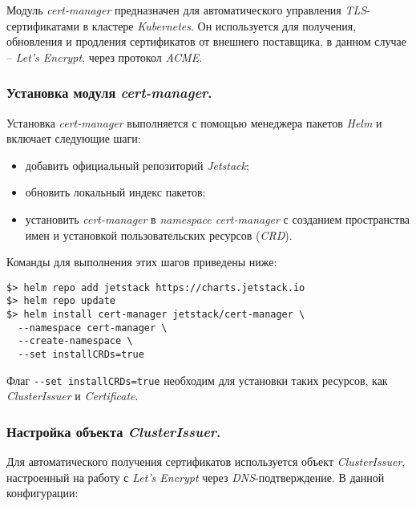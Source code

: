 Модуль \textit{cert-manager} предназначен для автоматического управления \textit{TLS}-сертификатами в кластере \textit{Kubernetes}. Он используется для получения, обновления и продления сертификатов от внешнего поставщика, в данном случае -- \textit{Let's Encrypt}, через протокол \textit{ACME}.

\subsubsection{Установка модуля \textit{cert-manager}.} Установка \textit{cert-manager} выполняется с помощью менеджера пакетов \textit{Helm} и включает следующие шаги:

\begin{itemize}
    \item добавить официальный репозиторий \textit{Jetstack};
    \item обновить локальный индекс пакетов;
    \item установить \textit{cert-manager} в \textit{namespace cert-manager} с созданием пространства имен и установкой пользовательских ресурсов (\textit{CRD}).
\end{itemize}

Команды для выполнения этих шагов приведены ниже:

\begin{lstlisting}
$> helm repo add jetstack https://charts.jetstack.io
$> helm repo update
$> helm install cert-manager jetstack/cert-manager \
  --namespace cert-manager \
  --create-namespace \
  --set installCRDs=true
\end{lstlisting}

Флаг \lstinline|--set installCRDs=true| необходим для установки таких ресурсов, как \textit{ClusterIssuer} и \textit{Certificate}.


\subsubsection{Настройка объекта \textit{ClusterIssuer}.} Для автоматического получения сертификатов используется объект \textit{ClusterIssuer}, настроенный на работу с \textit{Let's Encrypt} через \textit{DNS}-подтверждение. В данной конфигурации:

